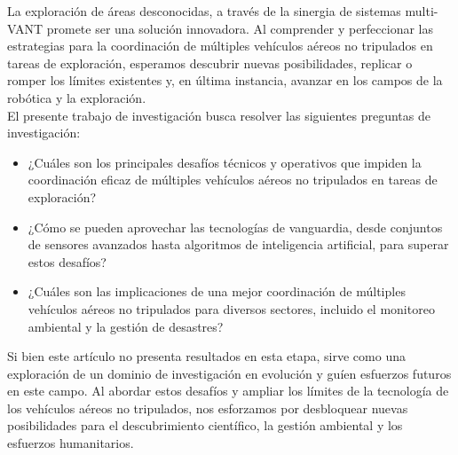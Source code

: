 \documentclass[sigconf]{acmart}
\begin{document}
La exploración de áreas desconocidas, a través de la sinergia de sistemas multi-VANT promete ser una solución innovadora. Al comprender y perfeccionar las estrategias para la coordinación de múltiples vehículos aéreos no tripulados en tareas de exploración, esperamos descubrir nuevas posibilidades, replicar o romper los límites existentes y, en última instancia, avanzar en los campos de la robótica y la exploración.\\

El presente trabajo de investigación busca resolver las siguientes preguntas de investigación:

\begin{itemize}
  \item ¿Cuáles son los principales desafíos técnicos y operativos que impiden la coordinación eficaz de múltiples vehículos aéreos no tripulados en tareas de exploración?
  \item ¿Cómo se pueden aprovechar las tecnologías de vanguardia, desde conjuntos de sensores avanzados hasta algoritmos de inteligencia artificial, para superar estos desafíos?
  \item ¿Cuáles son las implicaciones de una mejor coordinación de múltiples vehículos aéreos no tripulados para diversos sectores, incluido el monitoreo ambiental y la gestión de desastres?
\end{itemize}


Si bien este artículo no presenta resultados en esta etapa, sirve como una exploración de un dominio de investigación en evolución y guíen esfuerzos futuros en este campo. Al abordar estos desafíos y ampliar los límites de la tecnología de los vehículos aéreos no tripulados, nos esforzamos por desbloquear nuevas posibilidades para el descubrimiento científico, la gestión ambiental y los esfuerzos humanitarios.\\

\end{document}
